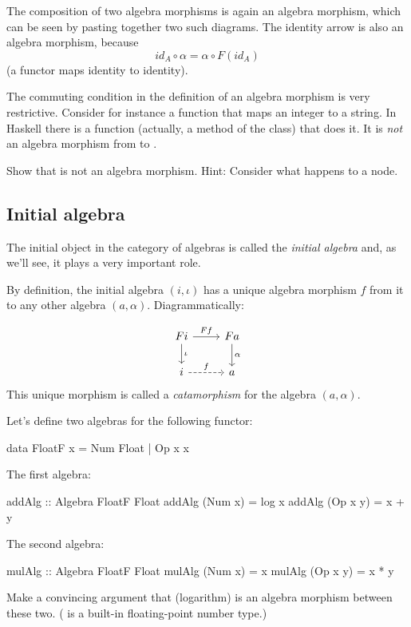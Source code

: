 \documentclass[DaoFP]{subfiles}
\begin{document}
The composition of two algebra morphisms is again an algebra morphism, which can be seen by pasting together two such diagrams. The identity arrow is also an algebra morphism, because 
\[ id_A \circ \alpha = \alpha \circ F (id_A) \]
(a functor maps identity to identity).

The commuting condition in the definition of an algebra morphism is very restrictive. Consider for instance a function that maps an integer to a string. In Haskell there is a  function (actually, a method of the  class) that does it. It is \emph{not} an algebra morphism from  to . 

\begin{exercise}
Show that  is not an algebra morphism. Hint: Consider what happens to a  node.
\end{exercise}

\subsection{Initial algebra}

The initial object in the category of algebras is called the \emph{initial algebra} and, as we'll see, it plays a very important role.

By definition, the initial algebra $(i, \iota)$ has a unique algebra morphism $f$ from it to any other algebra $(a, \alpha)$. Diagrammatically:

\[
 \begin{tikzcd}
 F i 
 \arrow[r, "F f"]
 \arrow[d, "\iota"]
 & F a
\arrow[d, "\alpha"]
 \\
 i
 \arrow[r, dashed, "f"]
 & a
  \end{tikzcd}
\]
 This unique morphism is called a \emph{catamorphism} for the algebra $(a, \alpha)$.


\begin{exercise}
Let's define two algebras for the following functor:
\begin{haskell}
data FloatF x = Num Float | Op x x
\end{haskell}
The first algebra:
\begin{haskell}
addAlg :: Algebra FloatF Float
addAlg (Num x) = log x
addAlg (Op x y) = x + y
\end{haskell}
The second algebra:
\begin{haskell}
mulAlg :: Algebra FloatF Float
mulAlg (Num x) = x
mulAlg (Op x y) = x * y
\end{haskell}
Make a convincing argument that  (logarithm) is an algebra morphism between these two. ( is a built-in floating-point number type.)
\end{exercise}
\end{document}
